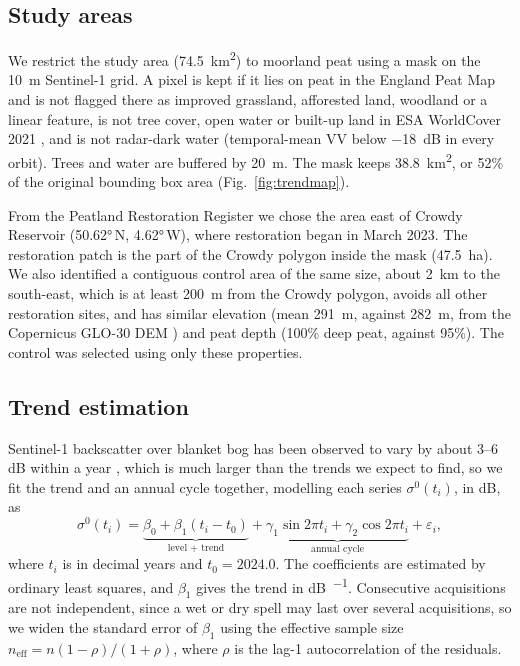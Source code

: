 \documentclass[10pt,a4paper,twocolumn]{article}
\begin{document}
\subsection{Study areas}
\label{sec:study}

We restrict the study area (\SI{74.5}{\kilo\metre\squared}) to moorland peat using a mask on the \SI{10}{\metre} Sentinel-1 grid.
A pixel is kept if it lies on peat in the England Peat Map \cite{nePeatMap} and is not flagged there as improved grassland, afforested land, woodland or a linear feature, is not tree cover, open water or built-up land in ESA WorldCover 2021 \cite{zanaga2022}, and is not radar-dark water (temporal-mean VV below \SI{-18}{\deci\bel} in every orbit).
Trees and water are buffered by \SI{20}{\metre}.
The mask keeps \SI{38.8}{\kilo\metre\squared}, or 52\% of the original bounding box area (Fig.~\ref{fig:trendmap}).

From the Peatland Restoration Register we chose the area east of Crowdy Reservoir (\ang{50.62}\,N, \ang{4.62}\,W), where restoration began in March 2023.
The restoration patch is the part of the Crowdy polygon inside the mask (\SI{47.5}{\hectare}).
We also identified a contiguous control area of the same size, about \SI{2}{\kilo\metre} to the south-east, which is at least \SI{200}{\metre} from the Crowdy polygon, avoids all other restoration sites, and has similar elevation (mean \SI{291}{\metre}, against \SI{282}{\metre}, from the Copernicus GLO-30 DEM \cite{copdem}) and peat depth (100\% deep peat, against 95\%).
The control was selected using only these properties.

\subsection{Trend estimation}
\label{sec:trend}
Sentinel-1 backscatter over blanket bog has been observed to vary by about 3--6\,dB within a year \cite{toca2023potential}, which is much larger than the trends we expect to find, so we fit the trend and an annual cycle together, modelling each series $\sigma^0(t_i)$, in dB, as
\begin{equation}
  \sigma^0(t_i) = \underbrace{\beta_0 + \beta_1 (t_i - t_0)}_{\text{level + trend}}
    + \underbrace{\gamma_1 \sin 2\pi t_i + \gamma_2 \cos 2\pi t_i}_{\text{annual cycle}}
    + \varepsilon_i,
  \label{eq:model}
\end{equation}
where $t_i$ is in decimal years and $t_0 = 2024.0$.
The coefficients are estimated by ordinary least squares, and $\beta_1$ gives the trend in \si{\deci\bel\per\year}.
Consecutive acquisitions are not independent, since a wet or dry spell may last over several acquisitions, so we widen the standard error of $\beta_1$ using the effective sample size $n_\text{eff} = n(1-\rho)/(1+\rho)$, where $\rho$ is the lag-1 autocorrelation of the residuals.
\end{document}
